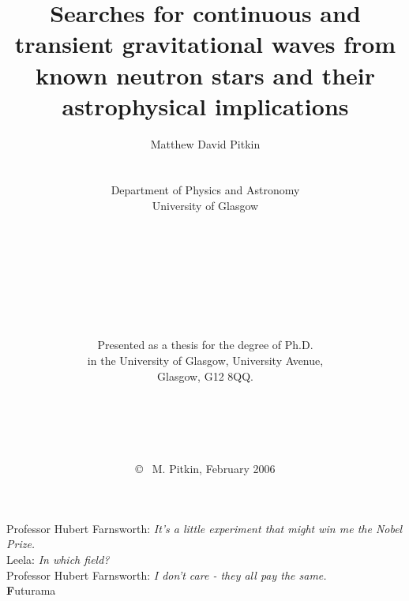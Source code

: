 \documentclass[12pt,a4paper,oneside,openright]{report}
\title{Searches for continuous and transient gravitational waves from known neutron stars and
their astrophysical implications}
\author{Matthew David Pitkin \\ \\ \\ Department of Physics and Astronomy \\
University of Glasgow \\ \\ \\ \\ \\ \\ \\ \\ \\ Presented as a thesis for the degree of Ph.D. \\ in
the University of Glasgow, University Avenue, \\ Glasgow, G12 8QQ. \\ \\ \\ \\ \\ \\ \copyright~ M.
Pitkin, February 2006}
\date{}
\begin{document}
\maketitle

\doublespacing
\begin{flushright}
Professor Hubert Farnsworth: {\it It's a little experiment that might win me the Nobel Prize.} \\
Leela: {\it In which field?} \\
Professor Hubert Farnsworth: {\it I don't care - they all pay the same.}\\
{\textbf Futurama}
\end{flushright}


\newpage

\tableofcontents
\listoffigures
\listoftables











%

\newpage



\end{document}
